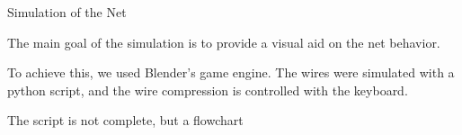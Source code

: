 Simulation of the Net

The main goal of the simulation is to provide a visual aid on the net behavior.

To achieve this, we used Blender's game engine. The wires were simulated with a python script, and the wire compression is controlled with the keyboard.

The script is not complete, but a flowchart 
